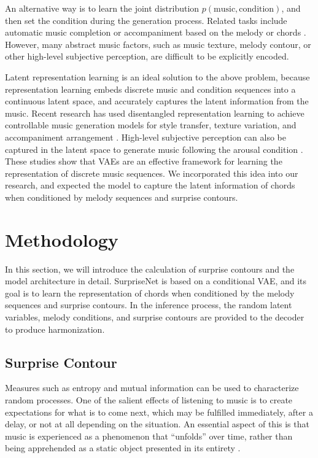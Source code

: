 \documentclass{article}
\begin{document}
An alternative way is to learn the joint distribution $p(\text{music},\text{condition})$, and then set the condition during the generation process. Related tasks include automatic music completion or accompaniment based on the melody or chords \cite{Hadjeres2017,Zhu2018,Dong2018,Donahue2019,Simon2018}. However, many abstract music factors, such as music texture, melody contour, or other high-level subjective perception, are difficult to be explicitly encoded.

Latent representation learning is an ideal solution to the above problem, because representation learning embeds discrete music and condition sequences into a continuous latent space, and accurately captures the latent information from the music. Recent research has used disentangled representation learning to achieve controllable music generation models for style transfer, texture variation, and accompaniment arrangement \cite{Wang2020}. High-level subjective perception can also be captured in the latent space to generate music following the arousal condition \cite{Tan2020}. These studies show that VAEs \cite{Kingma2014,Roberts2018} are an effective framework for learning the representation of discrete music sequences. We incorporated this idea into our research, and expected the model to capture the latent information of chords when conditioned by melody sequences and surprise contours.

\section{Methodology}

In this section, we will introduce the calculation of surprise contours and the model architecture in detail. SurpriseNet is based on a conditional VAE, and its goal is to learn the representation of chords when conditioned by the melody sequences and surprise contours. In the inference process, the random latent variables, melody conditions, and surprise contours are provided to the decoder to produce harmonization. 

\subsection{Surprise Contour}

 Measures such as entropy and mutual information can be used to characterize random processes. One of the salient effects of listening to music is to create expectations for what is to come next, which may be fulfilled immediately, after a delay, or not at all depending on the situation. An essential aspect of this is that music is experienced as a phenomenon that ``unfolds'' over time, rather than being apprehended as a static object presented in its entirety \cite{Abdallah2009}. 
 
\end{document}
